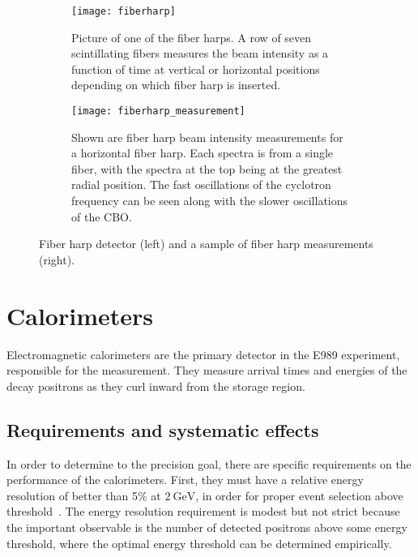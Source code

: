 \begin{figure}
\centering
    \begin{subfigure}[]{0.45\textwidth}
        \centering
        \vspace{-11mm}
        \texttt{[image: fiberharp]}
        \vspace{2mm}
        \caption{Picture of one of the fiber harps. A row of seven scintillating fibers measures the beam intensity as a function of time at vertical or horizontal positions depending on which fiber harp is inserted.}
    \label{fig:fiberharp}
    \end{subfigure}%
    \hspace{10mm}
    \begin{subfigure}[]{0.45\textwidth}
        \centering
        \texttt{[image: fiberharp\_measurement]}
        \vspace{-3mm}
        \caption{Shown are fiber harp beam intensity measurements for a horizontal fiber harp. Each spectra is from a single fiber, with the spectra at the top being at the greatest radial position. The fast oscillations of the cyclotron frequency can be seen along with the slower oscillations of the CBO.}
    \label{fig:fiberharp_measurement}
    \end{subfigure}
\caption[Fiber harp and measurement]{Fiber harp detector (left) and a sample of fiber harp measurements (right).}
\label{fig:fiberharppics}
\end{figure}





\section{Calorimeters}
\label{sec:Calorimeters}


Electromagnetic calorimeters are the primary detector in the E989 experiment, responsible for the \wa measurement. They measure arrival times and energies of the decay positrons as they curl inward from the storage region. 

\subsection{Requirements and systematic effects}
\label{sub:calosystematics}

In order to determine \wa to the precision goal, there are specific requirements on the performance of the calorimeters. First, they must have a relative energy resolution of better than 5\% at $\SI{2}{\GeV}$, in order for proper event selection above threshold~\cite{TDR}. The energy resolution requirement is modest but not strict because the important observable is the number of detected positrons above some energy threshold, where the optimal energy threshold can be determined empirically.

